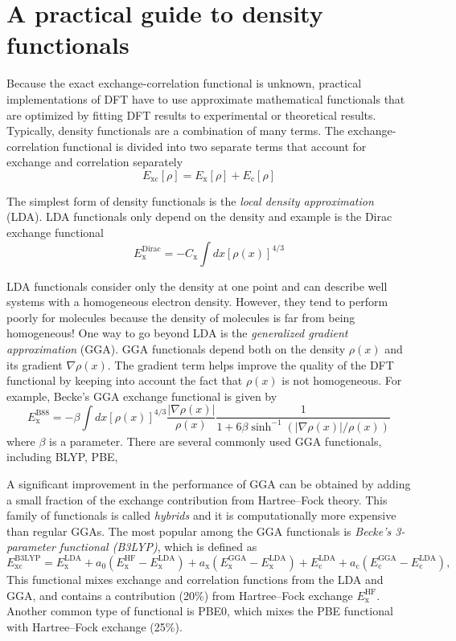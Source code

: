 \documentclass[../Main/chem371-notes.tex]{subfiles}
\begin{document}
\section{A practical guide to density functionals}

Because the exact exchange-correlation functional is unknown, practical implementations of DFT have to use approximate mathematical functionals that are optimized by fitting DFT results to experimental or theoretical results.
Typically, density functionals are a combination of many terms.
The exchange-correlation functional is divided into two separate terms that account for exchange and correlation separately
\begin{equation}
E_\mathrm{xc}[\rho] = E_\mathrm{x}[\rho] + E_\mathrm{c}[\rho]
\end{equation}

The simplest form of density functionals is the \emph{local density approximation} (LDA).
LDA functionals only depend on the density and example is the Dirac exchange functional
\begin{equation}
E_\mathrm{x}^\mathrm{Dirac} = - C_\mathrm{x} \int dx [\rho(x)]^{4/3}
\end{equation}

LDA functionals consider only the density at one point and can describe well systems with a homogeneous electron density.
However, they tend to perform poorly for molecules because the density of molecules is far from being homogeneous!
One way to go beyond LDA is the \emph{generalized gradient approximation} (GGA).
GGA functionals depend both on the density $\rho(x)$ and its gradient $\nabla \rho(x)$.
The gradient term helps improve the quality of the DFT functional by keeping into account the fact that $\rho(x)$ is not homogeneous.
For example, Becke's GGA exchange functional is given by
\begin{equation}
E_\mathrm{x}^\mathrm{B88} = - \beta \int dx [\rho(x)]^{4/3} \frac{|\nabla \rho(x)|}{\rho(x)} \frac{1}{1 + 6 \beta \sinh^{-1} (|\nabla \rho(x)|/\rho(x))}
\end{equation}
where $\beta$ is a parameter.
There are several commonly used GGA functionals, including BLYP, PBE, 

A significant improvement in the performance of GGA can be obtained by adding a small fraction of the exchange contribution from Hartree--Fock theory.
This family of functionals is called \emph{hybrids} and it is computationally more expensive than regular GGAs.
The most popular among the GGA functionals is \emph{Becke's 3-parameter functional (B3LYP)}, which is defined as
\begin{equation}
{\displaystyle E_{\text{xc}}^{\text{B3LYP}}=E_{\text{x}}^{\text{LDA}}+a_{0}(E_{\text{x}}^{\text{HF}}-E_{\text{x}}^{\text{LDA}})+a_{\text{x}}(E_{\text{x}}^{\text{GGA}}-E_{\text{x}}^{\text{LDA}})+E_{\text{c}}^{\text{LDA}}+a_{\text{c}}(E_{\text{c}}^{\text{GGA}}-E_{\text{c}}^{\text{LDA}}),}
\end{equation}
This functional mixes exchange and correlation functions from the LDA and GGA, and contains a contribution (20\%) from Hartree--Fock exchange $E_{\text{x}}^{\text{HF}}$.
Another common type of functional is PBE0, which mixes the PBE functional with Hartree--Fock exchange (25\%).
\end{document}
